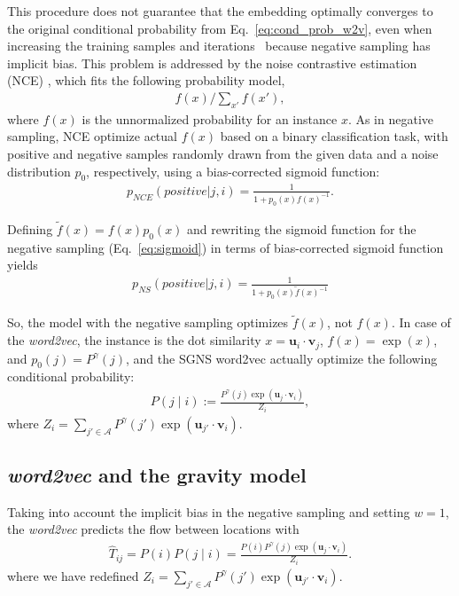 \documentclass[12pt,a4paper]{article}
\newcommand{\vect}[1]{\boldsymbol{#1}}
\def\given{\mid}
\begin{document}
This procedure does not guarantee that the embedding optimally converges to the original conditional probability from Eq.~\ref{eq:cond_prob_w2v}, even when increasing the training samples and iterations~\autocite{Chia2010,Dyer2014} because negative sampling has implicit bias.
This problem is addressed by the noise contrastive estimation (NCE) \autocite{Chia2010, dyer2014notes}, which fits the following probability model,
\begin{align}
	\label{eq:nce}
	f(x) / \sum_{x'} f(x'),
\end{align}
where $f(x)$ is the unnormalized probability for an instance $x$. As in negative sampling, NCE optimize actual $f(x)$ based on a binary classification task, with positive and negative samples randomly drawn from the given data and a noise distribution $p_0$, respectively, using a bias-corrected sigmoid function:
\begin{align}
	\label{eq:sigmoid2}
	p_{NCE}(positive|j,i) = \frac{1}{1 + p_0(x)f(x)^{-1}}.
\end{align}

Defining $\tilde f(x) = f(x) p_0(x)$ and rewriting the sigmoid function for the negative sampling (Eq.~\ref{eq:sigmoid}) in terms of bias-corrected sigmoid function yields
\begin{align}
	\label{eq:sigmoid3}
	p_{NS}(positive|j,i)  = \frac{1}{1 + p_0(x) \tilde f(x)^{-1}}
\end{align}

So, the model with the negative sampling optimizes $\tilde f(x)$, not $f(x)$. In case of the {\it word2vec}, the instance is the dot similarity $x=\vect{u}_i \cdot \vect{v}_j$,  $f(x)=\exp(x)$, and $p_0(j)=P^\gamma(j)$, and the SGNS word2vec actually optimize the following conditional probability:
\begin{align}
	P\left(j \given i \right):= \frac{P^\gamma (j)\exp(\vect{u}_j \cdot \vect{v}_{i})}{Z_i},
	\label{eq:real_cond}
\end{align}
where $Z_i=\sum_{j' \in \mathcal{A}} P^\gamma (j') \exp(\vect{u}_{j'} \cdot \vect{v}_{i})$.


\subsection{\textit{word2vec} and the gravity model}

Taking into account the implicit bias in the negative sampling  and setting $w=1$, the \textit{word2vec} predicts the flow between locations with
\begin{align}
	\hat{T}_{ij}= P(i) P(j\given i) = \frac{P(i)P^\gamma (j)\exp(\vect{u}_j \cdot \vect{v}_{i})}{Z_i}. \label{eq:prob_w2v_ng0}
\end{align}
where we have redefined $Z_i=\sum_{j' \in \mathcal{A}} P^ \gamma (j') \exp(\vect{u}_{j'} \cdot \vect{v}_{i})$.
\end{document}
